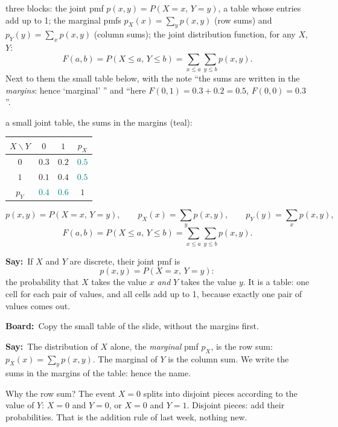 \documentclass[11pt,a4paper,parskip=half]{scrartcl}
\renewcommand{\needspace}[1]{\Needspace{6\baselineskip}}
\newcommand{\say}{\textbf{\color{teal}Say:}\ }
\newcommand{\board}{\textbf{\color{gold}Board:}\ }
\begin{document}
\begin{onslide}
	three blocks: the joint pmf $p(x,y)=P(X=x,\,Y=y)$, a table whose entries
	add up to 1; the marginal pmfs $p_X(x)=\sum_y p(x,y)$ (row sums) and
	$p_Y(y)=\sum_x p(x,y)$ (column sums); the joint distribution function, for
	any $X$, $Y$:
	\[ F(a,b)=P(X\le a,\,Y\le b)=\sum_{x\le a}\sum_{y\le b}p(x,y). \]
	Next to them the small table below, with the note ``the sums are written
	in the \emph{margins}: hence `marginal' '' and ``here $F(0,1)=0.3+0.2=0.5$,
	$F(0,0)=0.3$''.
\end{onslide}

\needspace{0.2\textheight}
\begin{slidefig}
	a small joint table, the sums in the margins (teal):
	\begin{center}
		\renewcommand{\arraystretch}{1.25}
		\begin{tabular}{c|cc|c}
			$X\backslash Y$ & $0$ & $1$ & $p_X$\\\hline
			$0$ & $0.3$ & $0.2$ & \textcolor{teal}{$0.5$}\\
			$1$ & $0.1$ & $0.4$ & \textcolor{teal}{$0.5$}\\\hline
			$p_Y$ & \textcolor{teal}{$0.4$} & \textcolor{teal}{$0.6$} & $1$
		\end{tabular}
	\end{center}
	\begin{printeq}
	\[ p(x,y)=P(X=x,\,Y=y),\qquad p_X(x)=\sum_y p(x,y),\qquad
		p_Y(y)=\sum_x p(x,y), \]
	\[ F(a,b)=P(X\le a,\,Y\le b)=\sum_{x\le a}\sum_{y\le b}p(x,y). \]
	\end{printeq}
\end{slidefig}

\say If $X$ and $Y$ are discrete, their joint pmf is
\[ p(x,y)=P(X=x,\,Y=y): \]
the probability that $X$ takes the value $x$ \emph{and} $Y$ takes the value
$y$. It is a table: one cell for each pair of values, and all cells add up
to 1, because exactly one pair of values comes out.

\board Copy the small table of the slide, without the margins first.

\say The distribution of $X$ alone, the \emph{marginal} pmf $p_X$, is the
row sum: $p_X(x)=\sum_y p(x,y)$. The marginal of $Y$ is the column sum. We
write the sums in the margins of the table: hence the name.

Why the row sum? The event $X=0$ splits into disjoint pieces according to
the value of $Y$: $X=0$ and $Y=0$, or $X=0$ and $Y=1$. Disjoint pieces:
add their probabilities. That is the addition rule of last week, nothing
new.
\end{document}
